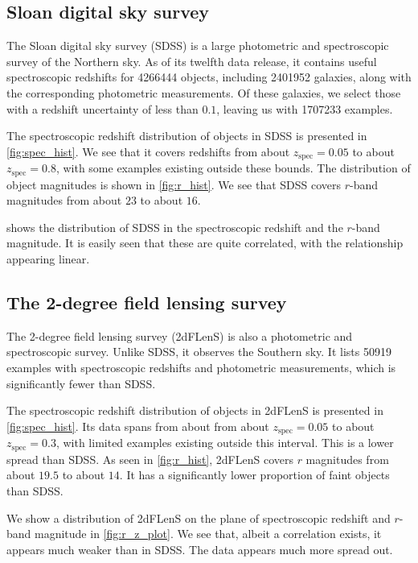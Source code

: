 \documentclass[11pt,twoside,openright]{report}
\begin{document}
  \subsection{Sloan digital sky survey}
  The Sloan digital sky survey (SDSS) is a large photometric and spectroscopic survey of the Northern sky. As of its twelfth data release, it contains useful spectroscopic redshifts for \SI{4266444}{} objects, including \SI{2401952}{} galaxies, along with the corresponding photometric measurements. \citep{SDSS} Of these galaxies, we select those with a redshift uncertainty of less than $0.1$, leaving us with \SI{1707233}{} examples.

  The spectroscopic redshift distribution of objects in SDSS is presented in \cref{fig:spec_hist}. We see that it covers redshifts from about $z_\mathrm{spec} = 0.05$ to about $z_\mathrm{spec} = 0.8$, with some examples existing outside these bounds. The distribution of object magnitudes is shown in \cref{fig:r_hist}. We see that SDSS covers $r$-band magnitudes from about $23$ to about $16$.

   shows the distribution of SDSS in the spectroscopic redshift and the $r$-band magnitude. It is easily seen that these are quite correlated, with the relationship appearing linear.

  \subsection{The 2-degree field lensing survey}
  The 2-degree field lensing survey (2dFLenS) is also a photometric and spectroscopic survey. \citep{Chris} Unlike SDSS, it observes the Southern sky. It lists \SI{50919}{} examples with spectroscopic redshifts and photometric measurements, which is significantly fewer than SDSS.

  The spectroscopic redshift distribution of objects in 2dFLenS is presented in \cref{fig:spec_hist}. Its data spans from about from about $z_\mathrm{spec} = 0.05$ to about $z_\mathrm{spec} = 0.3$, with limited examples existing outside this interval. This is a lower spread than SDSS. As seen in \cref{fig:r_hist}, 2dFLenS covers $r$ magnitudes from about $19.5$ to about $14$. It has a significantly lower proportion of faint objects than SDSS.

  We show a distribution of 2dFLenS on the plane of spectroscopic redshift and $r$-band magnitude in \cref{fig:r_z_plot}. We see that, albeit a correlation exists, it appears much weaker than in SDSS. The data appears much more spread out.
\end{document}
